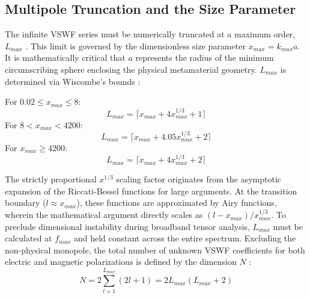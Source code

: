 \documentclass[11pt,a4paper]{article}
\begin{document}
\subsection{Multipole Truncation and the Size Parameter} \label{subsec:truncation}
The infinite VSWF series must be numerically truncated at a maximum order, $L_{max}$ \cite{mishchenko2002scattering}. This limit is governed by the dimensionless size parameter $x_{max} = k_{max}a$. It is mathematically critical that $a$ represents the radius of the minimum circumscribing sphere enclosing the physical metamaterial geometry. $L_{max}$ is determined via Wiscombe's bounds \cite{mishchenko2002scattering}:

\noindent For $0.02 \le x_{max} \le 8$:
\begin{equation}
    L_{max} = \lceil x_{max} + 4 x_{max}^{1/3} + 1 \rceil
    \label{eq:wiscombe_1}
\end{equation}
For $8 < x_{max} < 4200$:
\begin{equation}
    L_{max} = \lceil x_{max} + 4.05 x_{max}^{1/3} + 2 \rceil
    \label{eq:wiscombe_2}
\end{equation}
For $x_{max} \ge 4200$:
\begin{equation}
    L_{max} = \lceil x_{max} + 4 x_{max}^{1/3} + 2 \rceil
    \label{eq:wiscombe_3}
\end{equation}

The strictly proportional $x^{1/3}$ scaling factor originates from the asymptotic expansion of the Riccati-Bessel functions for large arguments. At the transition boundary ($l \approx x_{max}$), these functions are approximated by Airy functions, wherein the mathematical argument directly scales as $(l - x_{max}) / x_{max}^{1/3}$. To preclude dimensional instability during broadband tensor analysis, $L_{max}$ must be calculated at $f_{max}$ and held constant across the entire spectrum. Excluding the non-physical monopole, the total number of unknown VSWF coefficients for both electric and magnetic polarizations is defined by the dimension $N$ \cite{mishchenko1996tmatrix}:
\begin{equation}
    N = 2 \sum_{l=1}^{L_{max}} (2l+1) = 2L_{max}(L_{max} + 2)
    \label{eq:unknown_dimension}
\end{equation}
\end{document}
